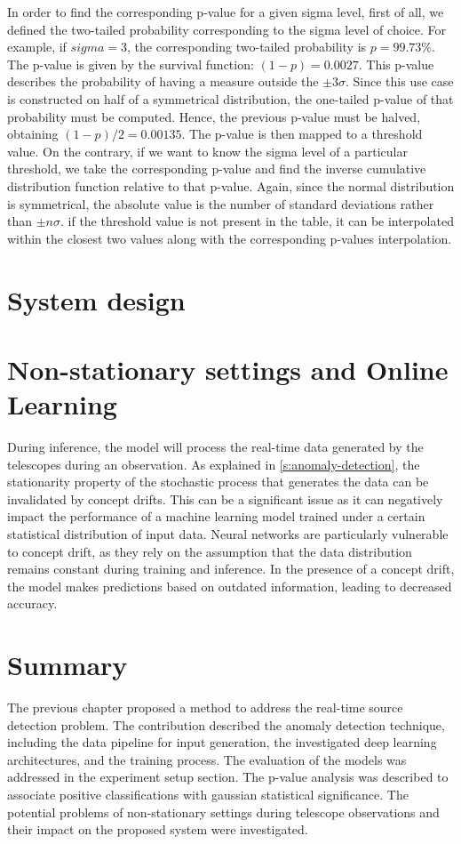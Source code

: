 In order to find the corresponding p-value for a given sigma level, first of all, we defined the two-tailed probability corresponding to the sigma level of choice. For example, if $sigma=3$, the corresponding two-tailed probability is $p=99.73\%$. The p-value is given by the survival function: $(1-p)=0.0027$. This p-value describes the probability of having a measure outside the  $\pm3\sigma$. Since this use case is constructed on half of a symmetrical distribution, the one-tailed p-value of that probability must be computed. Hence, the previous p-value must be halved, obtaining $(1-p)/2=0.00135$. The p-value is then mapped to a threshold value. On the contrary, if we want to know the sigma level of a particular threshold, we take the corresponding p-value and find the inverse cumulative distribution function relative to that p-value. Again, since the normal distribution is symmetrical, the absolute value is the number of standard deviations rather than  $\pm n\sigma$. if the threshold value is not present in the table, it can be interpolated within the closest two values along with the corresponding p-values interpolation.  


\section{System design}
\label{s:system-design}


\section{Non-stationary settings and Online Learning}
\label{s:non-stationary-settings}
During inference, the model will process the real-time data generated by the telescopes during an observation. As explained in \autoref{s:anomaly-detection}, the stationarity property of the stochastic process that generates the data can be invalidated by concept drifts. This can be a significant issue as it can negatively impact the performance of a machine learning model trained under a certain statistical distribution of input data. Neural networks are particularly vulnerable to concept drift, as they rely on the assumption that the data distribution remains constant during training and inference. In the presence of a concept drift, the model makes predictions based on outdated information, leading to decreased accuracy. 





\section{Summary}
The previous chapter proposed a method to address the real-time source detection problem. The contribution described the anomaly detection technique, including the data pipeline for input generation, the investigated deep learning architectures, and the training process. The evaluation of the models was addressed in the experiment setup section. The p-value analysis was described to associate positive classifications with gaussian statistical significance. The potential problems of non-stationary settings during telescope observations and their impact on the proposed system were investigated.